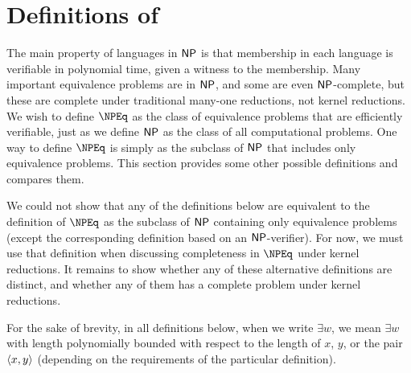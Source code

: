 \section{Definitions of \texorpdfstring{\NPEq}{NPEq}}
\label{sec:definitions}
%
The main property of languages in ${\mathsf{NP}}$ is that membership in each language is verifiable in polynomial time, given a witness to the membership.
Many important equivalence problems are in ${\mathsf{NP}}$, and some are even ${\mathsf{NP}}$-complete, but these are complete under traditional many-one reductions, not kernel reductions.
We wish to define $\NPEq$ as the class of equivalence problems that are efficiently verifiable, just as we define ${\mathsf{NP}}$ as the class of all computational problems.
One way to define $\NPEq$ is simply as the subclass of ${\mathsf{NP}}$ that includes only equivalence problems.
This section provides some other possible definitions and compares them.

%
We could not show that any of the definitions below are equivalent to the definition of $\NPEq$ as the subclass of ${\mathsf{NP}}$ containing only equivalence problems (except the corresponding definition based on an ${\mathsf{NP}}$-verifier).
For now, we must use that definition when discussing completeness in $\NPEq$ under kernel reductions.
It remains to show whether any of these alternative definitions are distinct, and whether any of them has a complete problem under kernel reductions.

For the sake of brevity, in all definitions below, when we write $\exists w$, we mean $\exists w$ with length polynomially bounded with respect to the length of $x$, $y$, or the pair $\left\langle x,y\right\rangle$ (depending on the requirements of the particular definition).

